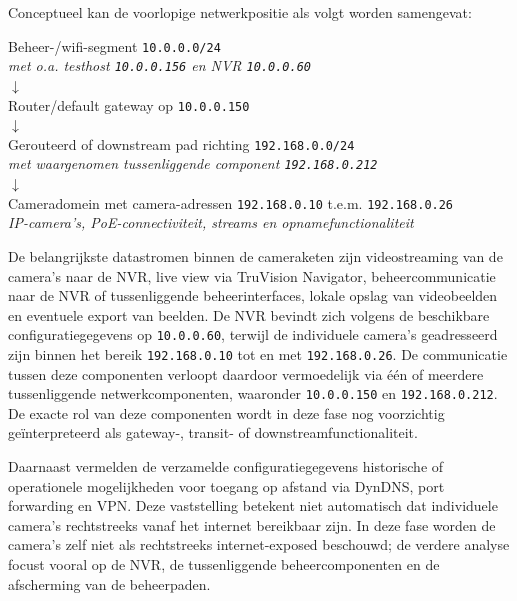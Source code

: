 Conceptueel kan de voorlopige netwerkpositie als volgt worden samengevat:

\begin{center}
    \begin{minipage}{0.9\textwidth}
        \centering
        Beheer-/wifi-segment \texttt{10.0.0.0/24}\\
        \textit{met o.a. testhost \texttt{10.0.0.156} en NVR \texttt{10.0.0.60}}\\[0.4em]
        $\downarrow$\\[0.4em]
        
        Router/default gateway op \texttt{10.0.0.150}\\[0.4em]
        $\downarrow$\\[0.4em]
        
        Gerouteerd of downstream pad richting \texttt{192.168.0.0/24}\\
        \textit{met waargenomen tussenliggende component \texttt{192.168.0.212}}\\[0.4em]
        $\downarrow$\\[0.4em]
        
        Cameradomein met camera-adressen \texttt{192.168.0.10} t.e.m. \texttt{192.168.0.26}\\
        \textit{IP-camera's, PoE-connectiviteit, streams en opnamefunctionaliteit}
    \end{minipage}
\end{center}

De belangrijkste datastromen binnen de cameraketen zijn videostreaming van de camera's naar de NVR, live view via TruVision Navigator, beheercommunicatie naar de NVR of tussenliggende beheerinterfaces, lokale opslag van videobeelden en eventuele export van beelden. De NVR bevindt zich volgens de beschikbare configuratiegegevens op \texttt{10.0.0.60}, terwijl de individuele camera's geadresseerd zijn binnen het bereik \texttt{192.168.0.10} tot en met \texttt{192.168.0.26}. De communicatie tussen deze componenten verloopt daardoor vermoedelijk via één of meerdere tussenliggende netwerkcomponenten, waaronder \texttt{10.0.0.150} en \texttt{192.168.0.212}. De exacte rol van deze componenten wordt in deze fase nog voorzichtig geïnterpreteerd als gateway-, transit- of downstreamfunctionaliteit.

Daarnaast vermelden de verzamelde configuratiegegevens historische of operationele mogelijkheden voor toegang op afstand via DynDNS, port forwarding en VPN. Deze vaststelling betekent niet automatisch dat individuele camera's rechtstreeks vanaf het internet bereikbaar zijn. In deze fase worden de camera's zelf niet als rechtstreeks internet-exposed beschouwd; de verdere analyse focust vooral op de NVR, de tussenliggende beheercomponenten en de afscherming van de beheerpaden.

